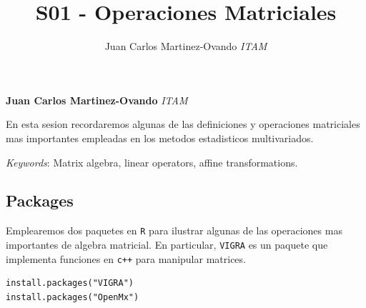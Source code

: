 \documentclass[11pt,]{article}
\title{S01 - Operaciones Matriciales  }
\author{\Large Juan Carlos Martinez-Ovando\vspace{0.05in} \newline\normalsize\emph{ITAM}  }
\date{}
\newcommand*{\authorfont}{\fontfamily{phv}\selectfont}
\renewenvironment{abstract}
 {{%
    \setlength{\leftmargin}{0mm}
    \setlength{\rightmargin}{\leftmargin}%
  }%
  \relax}
 {\endlist}
\begin{document}
	
%

{%
\setlength{\parindent}{0pt}
\thispagestyle{plain}
{\fontsize{18}{20}\selectfont\raggedright 
\maketitle  %

}

{
   \vskip 13.5pt\relax \normalsize\fontsize{11}{12} 
\textbf{\authorfont Juan Carlos Martinez-Ovando} \hskip 15pt \emph{\small ITAM}   

}

}








\begin{abstract}

    \hbox{\vrule height .2pt width 39.14pc}

    \vskip 8.5pt %

\noindent En esta sesion recordaremos algunas de las definiciones y operaciones
matriciales mas importantes empleadas en los metodos estadisticos
multivariados.


\vskip 8.5pt \noindent \emph{Keywords}: Matrix algebra, linear operators, affine transformations. \par

    \hbox{\vrule height .2pt width 39.14pc}



\end{abstract}


\vskip 6.5pt


\noindent  \subsection{Packages}\label{packages}

Emplearemos dos paquetes en \texttt{R} para ilustrar algunas de las
operaciones mas importantes de algebra matricial. En particular,
\texttt{VIGRA} es un paquete que implementa funciones en \texttt{c++}
para manipular matrices.

\begin{verbatim}
install.packages("VIGRA")
install.packages("OpenMx")
\end{verbatim}
\end{document}
